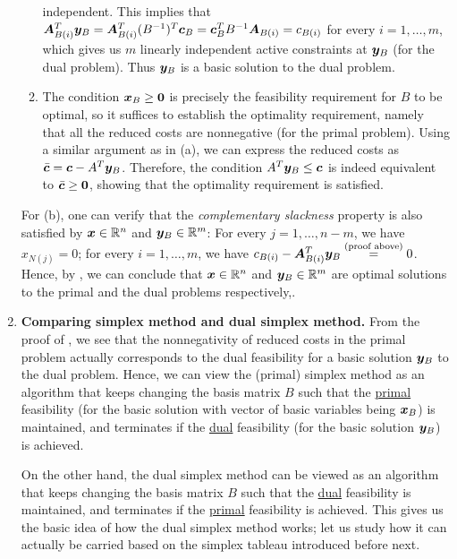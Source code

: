 \begin{enumerate}
\begin{pf}
\begin{enumerate}
independent. This implies that
\(\bm{A}_{B(i)}^{T}\bm{y}_{B}=\bm{A}_{B(i)}^{T}(B^{-1})^{T}\bm{c}_{B}
=\bm{c}_{B}^{T}B^{-1}\bm{A}_{B(i)}=c_{B(i)}\) for every \(i=1,\dotsc,m\),
which gives us \(m\) linearly independent active constraints at
\(\bm{y}_{B}\) (for the dual problem).  Thus \(\bm{y}_{B}\) is a basic
solution to the dual problem.
\item The condition \(\bm{x}_{B}\ge\bm{0}\) is precisely the feasibility
requirement for \(B\) to be optimal, so it suffices to establish the optimality
requirement, namely that all the reduced costs are nonnegative (for the primal
problem). Using a similar argument as in (a), we can express the reduced costs
as \(\bar{\bm{c}}=\bm{c}-A^{T}\bm{y}_{B}\). Therefore, the condition
\(A^{T}\bm{y}_{B}\le\bm{c}\) is indeed equivalent to
\(\bar{\bm{c}}\ge\bm{0}\), showing that the optimality requirement is
satisfied.
\end{enumerate}
\end{pf}

\begin{note}
For (b), one can verify that the \emph{complementary slackness} property is
also satisfied by \(\bm{x}\in\mathbb{R}^n\) and \(\bm{y}_{B}\in\mathbb{R}^m\): For every
\(j=1,\dotsc,n-m\), we have \(x_{N(j)}=0\); for every \(i=1,\dotsc,m\), we have
\(c_{B(i)}-\bm{A}_{B(i)}^{T}\bm{y}_{B}\overset{\text{(proof above)}}{=}0\).
Hence, by , we can conclude that
\(\bm{x}\in\mathbb{R}^n\) and \(\bm{y}_{B}\in\mathbb{R}^m\) are optimal solutions to the
primal and the dual problems respectively,.
\end{note}
\item \textbf{Comparing simplex method and dual simplex method.} From the proof
of , we see that the nonnegativity of
reduced costs in the primal problem actually corresponds to the dual
feasibility for a basic solution \(\bm{y}_{B}\) to the dual problem. Hence,
we can view the (primal) simplex method as an algorithm that keeps changing the
basis matrix \(B\) such that the \underline{primal} feasibility (for the
basic solution with vector of basic variables being
\(\bm{x}_{B}\)) is maintained, and terminates if the \underline{dual}
feasibility (for the basic solution \(\bm{y}_{B}\)) is achieved.

On the other hand, the dual simplex method can be viewed as an algorithm that
keeps changing the basis matrix \(B\) such that the \underline{dual}
feasibility is maintained, and terminates if the \underline{primal} feasibility
is achieved. This gives us the basic idea of how the dual simplex method works;
let us study how it can actually be carried based on the simplex tableau
introduced before next.


\end{enumerate}
